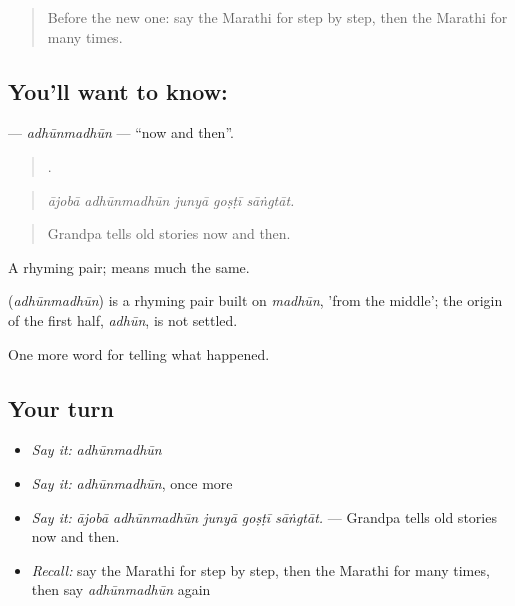 \label{lesson:MR-C306-adhunmadhun}



\begin{quote}
Before the new one: say the Marathi for step by step, then the Marathi for many times.
\end{quote}

\subsection*{You'll want to know: }
\textbf{} — \emph{adhūnmadhūn} — \textquotedblleft{}now and then\textquotedblright{}.

\begin{quote}
    .
\end{quote}

\begin{quote}
\emph{ājobā adhūnmadhūn junyā goṣṭī sāṅgtāt.}
\end{quote}

\begin{quote}
Grandpa tells old stories now and then.
\end{quote}

A rhyming pair;  means much the same.

\begin{cousinweb}
\textbf{} (\emph{adhūnmadhūn}) is a rhyming pair built on \emph{madhūn}, 'from the middle'; the origin of the first half, \emph{adhūn}, is not settled.
\end{cousinweb}

\begin{grammarlens}[title={What you've built}]
One more word for telling what happened.
\end{grammarlens}

\subsection*{Your turn}
\begin{itemize}
\raggedright
  \item \emph{Say it:} \emph{adhūnmadhūn}
  \item \emph{Say it:} \emph{adhūnmadhūn}, once more
  \item \emph{Say it:} \emph{ājobā adhūnmadhūn junyā goṣṭī sāṅgtāt.} — Grandpa tells old stories now and then.
  \item \emph{Recall:} say the Marathi for step by step, then the Marathi for many times, then say \emph{adhūnmadhūn} again
\end{itemize}

